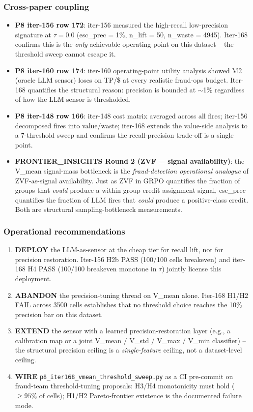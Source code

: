 \documentclass{article}
\begin{document}
\subsubsection{Cross-paper coupling}
\begin{itemize}
\item \textbf{P8 iter-156 row 172}: iter-156 measured the
high-recall low-precision signature at $\tau=0.0$ (esc\_prec = 1\%,
n\_lift = 50, n\_waste = 4945). Iter-168 confirms this is the
\emph{only} achievable operating point on this dataset -- the
threshold sweep cannot escape it.
\item \textbf{P8 iter-160 row 174}: iter-160 operating-point utility
analysis showed M2 (oracle LLM sensor) loses on TP/\$ at every
realistic fraud-ops budget. Iter-168 quantifies the structural
reason: precision is bounded at $\sim$1\% regardless of how the LLM
sensor is thresholded.
\item \textbf{P8 iter-148 row 166}: iter-148 cost matrix averaged
across all fires; iter-156 decomposed fires into value/waste;
iter-168 extends the value-side analysis to a 7-threshold sweep
and confirms the recall-precision trade-off is a single point.
\item \textbf{FRONTIER\_INSIGHTS Round 2 (ZVF = signal
availability)}: the V\_mean signal-mass bottleneck is the
\emph{fraud-detection operational analogue} of ZVF-as-signal
availability. Just as ZVF in GRPO quantifies the fraction of
groups that \emph{could} produce a within-group credit-assignment
signal, esc\_prec quantifies the fraction of LLM fires that
\emph{could} produce a positive-class credit. Both are structural
sampling-bottleneck measurements.
\end{itemize}

\subsubsection{Operational recommendations}
\begin{enumerate}
\item \textbf{DEPLOY} the LLM-as-sensor at the cheap tier for
recall lift, not for precision restoration. Iter-156 H2b PASS
(100/100 cells breakeven) and iter-168 H4 PASS (100/100 breakeven
monotone in $\tau$) jointly license this deployment.
\item \textbf{ABANDON} the precision-tuning thread on V\_mean alone.
Iter-168 H1/H2 FAIL across 3500 cells establishes that no
threshold choice reaches the 10\% precision bar on this dataset.
\item \textbf{EXTEND} the sensor with a learned precision-restoration
layer (e.g., a calibration map or a joint V\_mean / V\_std / V\_max /
V\_min classifier) -- the structural precision ceiling is a
\emph{single-feature} ceiling, not a dataset-level ceiling.
\item \textbf{WIRE} \texttt{p8\_iter168\_vmean\_threshold\_sweep.py}
as a CI pre-commit on fraud-team threshold-tuning proposals:
H3/H4 monotonicity must hold ($\geq 95\%$ of cells); H1/H2
Pareto-frontier existence is the documented failure mode.
\end{enumerate}
\end{document}
